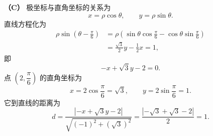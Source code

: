 \begin{answer}
\textbf{（C）} 极坐标与直角坐标的关系为
\nopagebreak[4]
\[x=\rho\cos\theta,\qquad y=\rho\sin\theta.\]
直线方程化为
\nopagebreak[4]
\[\begin{aligned}
\rho\sin\left(\theta-\frac\pi6\right)
&=\rho\left(\sin\theta\cos\frac\pi6-\cos\theta\sin\frac\pi6\right)\\
&=\frac{\sqrt3}{2}y-\frac12x=1,
\end{aligned}\]
即
\nopagebreak[4]
\[-x+\sqrt3y-2=0.\]
点 $\left(2,\dfrac\pi6\right)$ 的直角坐标为
\nopagebreak[4]
\[x=2\cos\frac\pi6=\sqrt3,\qquad y=2\sin\frac\pi6=1.\]
它到直线的距离为
\nopagebreak[4]
\[d=\frac{|-x+\sqrt3y-2|}{\sqrt{(-1)^2+(\sqrt3)^2}}
=\frac{|-\sqrt3+\sqrt3-2|}{2}=1.\]


\end{answer}
